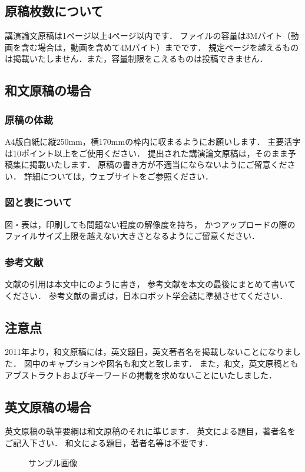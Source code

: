 \documentclass[a4paper]{jarticle}  %
\begin{document}
\subsection{原稿枚数について}
講演論文原稿は1ページ以上4ページ以内です．
ファイルの容量は3Mバイト（動画を含む場合は，動画を含めて4Mバイト）までです．
規定ページを越えるものは掲載いたしません．また，容量制限をこえるものは投稿できません．

\subsection{和文原稿の場合}
\subsubsection{原稿の体裁}
A4版白紙に縦250mm，横170mmの枠内に収まるようにお願いします．
主要活字は10ポイント以上をご使用ください．
提出された講演論文原稿は，そのまま予稿集に掲載いたします．
原稿の書き方が不適当にならないようにご留意ください．
詳細については，ウェブサイト\cite{website}をご参照ください．
\subsubsection{図と表について}
図・表は，印刷しても問題ない程度の解像度を持ち，
かつアップロードの際のファイルサイズ上限を越えない大きさとなるようにご留意ください．
\subsubsection{参考文献}
文献の引用は本文中に\cite{yamada2000}のように書き，
参考文献を本文の最後にまとめて書いてください．
参考文献の書式は，日本ロボット学会誌に準拠させてください．

\subsection{注意点}
2011年より，和文原稿には，英文題目，英文著者名を掲載しないことになりました．
図中のキャプションや図名も和文と致します．
また，和文，英文原稿ともアブストラクトおよびキーワードの掲載を求めないことにいたしました．

\subsection{英文原稿の場合}
英文原稿の執筆要綱は和文原稿のそれに準じます．
英文による題目，著者名をご記入下さい．
和文による題目，著者名等は不要です．

\begin{figure}[tb]
  \centering
  \caption{サンプル画像}
  \label{fig:sample}
\end{figure}
\end{document}
